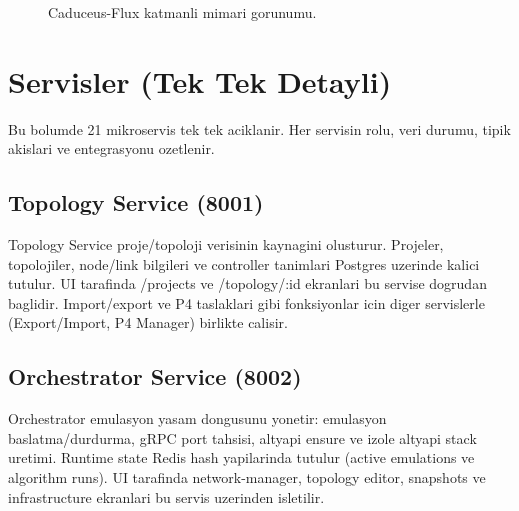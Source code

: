 \documentclass[conference]{IEEEtran}
\begin{document}
\begin{figure}[htbp]
\centering
{}
\caption{Caduceus-Flux katmanli mimari gorunumu.}
\label{fig:arch}
\end{figure}

\section{Servisler (Tek Tek Detayli)}
Bu bolumde 21 mikroservis tek tek aciklanir. Her servisin rolu, veri durumu, tipik akislari ve entegrasyonu ozetlenir.

\subsection{Topology Service (8001)}
Topology Service proje/topoloji verisinin kaynagini olusturur. Projeler, topolojiler, node/link bilgileri ve controller tanimlari Postgres uzerinde kalici tutulur. UI tarafinda /projects ve /topology/:id ekranlari bu servise dogrudan baglidir. Import/export ve P4 taslaklari gibi fonksiyonlar icin diger servislerle (Export/Import, P4 Manager) birlikte calisir.

\subsection{Orchestrator Service (8002)}
Orchestrator emulasyon yasam dongusunu yonetir: emulasyon baslatma/durdurma, gRPC port tahsisi, altyapi ensure ve izole altyapi stack uretimi. Runtime state Redis hash yapilarinda tutulur (active emulations ve algorithm runs). UI tarafinda network-manager, topology editor, snapshots ve infrastructure ekranlari bu servis uzerinden isletilir.
\end{document}
